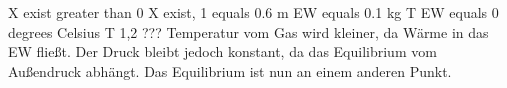 X exist greater than 0
X exist, 1 equals 0.6
m EW equals 0.1 kg
T EW equals 0 degrees Celsius
T 1,2 ??? 
Temperatur vom Gas wird kleiner, da Wärme in das EW fließt. Der Druck bleibt jedoch konstant, da das Equilibrium vom Außendruck abhängt.
Das Equilibrium ist nun an einem anderen Punkt.